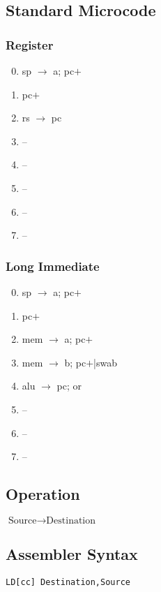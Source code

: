 \documentclass[11pt]{book}
\newcommand*{\instruction}[2][]{%
  \clearpage
  \thispagestyle{fancy}%
  \fancyhf[HL,HR]{\huge{#2}}%
  \fancyhf[HC]{#1}\addtocounter{section}{1}\noindent
}
\begin{document}
\subsection*{Standard Microcode}
\begin{multicols}{2}\ttfamily\selectfont\small
  \subsubsection*{Register}
  \begin{enumerate}\setcounter{enumi}{-1}
  \item sp \(\rightarrow\) a; pc\(+\)
  \item pc\(+\)
  \item rs \(\rightarrow\) pc
  \item --
  \item --
  \item --
  \item --
  \item --
  \end{enumerate}
  \columnbreak
  \subsubsection*{Long Immediate}
  \begin{enumerate}\setcounter{enumi}{-1}
  \item sp \(\rightarrow\) a; pc\(+\)
  \item pc\(+\)
  \item mem \(\rightarrow\) a; pc\(+\)
  \item mem \(\rightarrow\) b; pc\(+\)|swab
  \item alu \(\rightarrow\) pc; or
  \item --
  \item --
  \item --
  \end{enumerate}
\end{multicols}


\instruction[Load]{LD}
\subsection*{Operation}
\(\text{Source}\rightarrow\text{Destination}\)

\subsection*{Assembler Syntax}
\texttt{LD[cc] Destination,Source}
\end{document}
